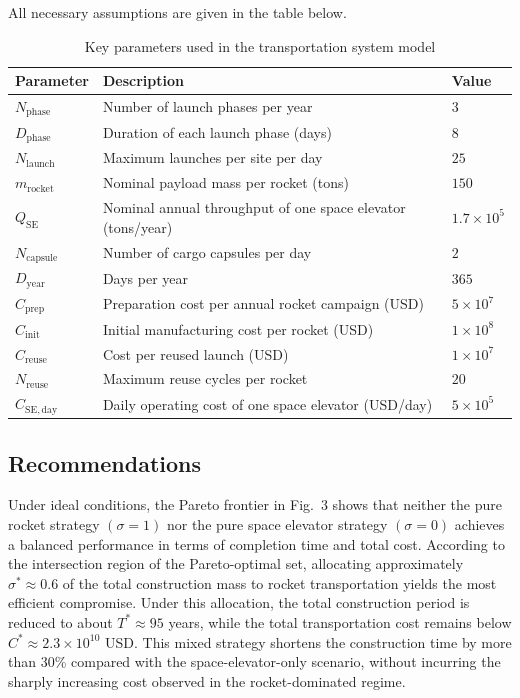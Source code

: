 \documentclass[12pt]{article}
\begin{document}
All necessary assumptions are given in the table below.

\begin{table}[htbp]
\centering
\renewcommand{\arraystretch}{1.2}
\begin{tabular}{lll}
\hline
Parameter & Description & Value \\
\hline
$N_{\mathrm{phase}}$   & Number of launch phases per year                         & $3$ \\
$D_{\mathrm{phase}}$   & Duration of each launch phase (days)                     & $8$ \\
$N_{\mathrm{launch}}$  & Maximum launches per site per day                         & $25$ \\
$m_{\mathrm{rocket}}$  & Nominal payload mass per rocket (tons)                    & $150$ \\
$Q_{\mathrm{SE}}$      & Nominal annual throughput of one space elevator (tons/year) & $1.7 \times 10^{5}$ \\
$N_{\mathrm{capsule}}$ & Number of cargo capsules per day                          & $2$ \\
$D_{\mathrm{year}}$    & Days per year                                             & $365$ \\
$C_{\mathrm{prep}}$    & Preparation cost per annual rocket campaign (USD)         & $5 \times 10^{7}$ \\
$C_{\mathrm{init}}$    & Initial manufacturing cost per rocket (USD)               & $1 \times 10^{8}$ \\
$C_{\mathrm{reuse}}$   & Cost per reused launch (USD)                              & $1 \times 10^{7}$ \\
$N_{\mathrm{reuse}}$   & Maximum reuse cycles per rocket                           & $20$ \\
$C_{\mathrm{SE,day}}$  & Daily operating cost of one space elevator (USD/day)      & $5 \times 10^{5}$ \\
\hline
\end{tabular}
\caption{Key parameters used in the transportation system model}
\label{tab:parameters}
\end{table}

\subsection{Recommendations}

Under ideal conditions, the Pareto frontier in Fig.~3 shows that neither the pure rocket strategy $(\sigma = 1)$ nor the pure space elevator strategy $(\sigma = 0)$ achieves a balanced performance in terms of completion time and total cost. According to the intersection region of the Pareto-optimal set, allocating approximately $\sigma^{*} \approx 0.6$ of the total construction mass to rocket transportation yields the most efficient compromise. Under this allocation, the total construction period is reduced to about $T^{*} \approx 95$ years, while the total transportation cost remains below $C^{*} \approx 2.3 \times 10^{10}$ USD. This mixed strategy shortens the construction time by more than 30\% compared with the space-elevator-only scenario, without incurring the sharply increasing cost observed in the rocket-dominated regime.
\end{document}
